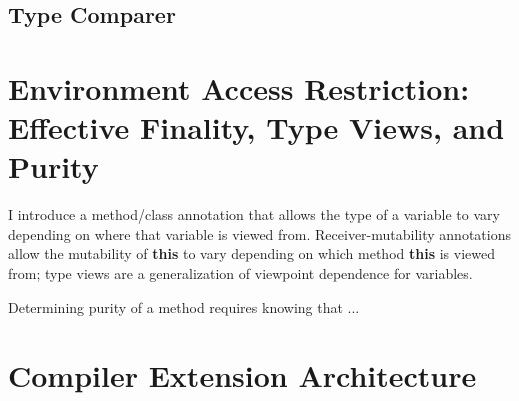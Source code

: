 \documentclass[11pt]{report}
\newcommand{\cdf}{\bf\ttfamily} %
\newcommand{\cd}{\cdf\small}  %
\begin{document}
\section{Type Comparer}



\chapter{Environment Access Restriction: Effective Finality, Type Views, and Purity}

I introduce a method/class annotation that allows the type of a variable to vary depending on where that variable is viewed from. Receiver-mutability annotations allow the mutability of {\cd this} to vary depending on which method {\cd this} is viewed from; type views are a generalization of viewpoint dependence for variables.

Determining purity of a method requires knowing that ...


\chapter{Compiler Extension Architecture}



\renewcommand*{\bibname}{References}

\end{document}
